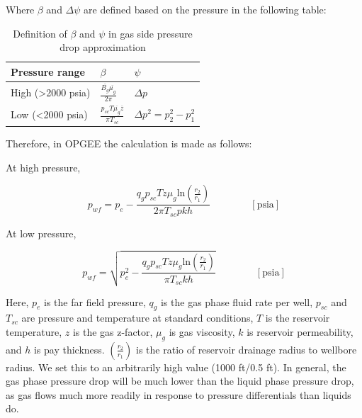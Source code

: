 \documentclass[11pt]{report}
\newcommand{\eqnunit}[1]{\quad\quad \scriptstyle{\left[\text{#1}\right]}}
\begin{document}
Where $\beta$ and $\Delta \psi$ are defined based on the pressure in the following table:

\begin{table}[ht]
\begin{scriptsize}
\caption{Definition of $\beta$ and $\psi$ in gas side pressure drop approximation}
\begin{tabular*}{0.8\columnwidth}{p{}p{}p{}}
\toprule
Pressure range & $\beta$ & $\psi$ \\
\midrule
High (>2000 psia) & $\frac{\overline{B_g}\overline{\mu_g}}{2\pi}$ & $\Delta p$ \\
Low (<2000 psia) & $\frac{p_{sc} T \overline{\mu_g} \overline{z}}{\pi T_{sc}}$ & $\Delta p^2 = p_2^2 - p_1^2$ \\
\bottomrule
\end{tabular*}
\end{scriptsize}
\end{table}

Therefore, in OPGEE the calculation is made as follows:

At high pressure,

\begin{equation} 
p_{wf} = p_e - \frac{q_g p_{sc} T z \mu_g \text{ln}\left(\frac{r_2}{r_1} \right)}{2 \pi T_{sc} p k h} \quad\quad\eqnunit{psia}
\end{equation}

At low pressure,

\begin{equation} 
p_{wf} = \sqrt{p_e^2 - \frac{q_g p_{sc} T z \mu_g \text{ln}\left(\frac{r_2}{r_1} \right)}{\pi T_{sc} k h}} \quad\quad\eqnunit{psia}
\end{equation}

Here, $p_e$ is the far field pressure, $q_g$ is the gas phase fluid rate per well, $p_{sc}$ and $T_{sc}$ are pressure and temperature at standard conditions, $T$ is the reservoir temperature, $z$ is the gas z-factor, $\mu_g$ is gas viscosity, $k$ is reservoir permeability, and $h$ is pay thickness. $\left(\frac{r_2}{r_1} \right)$ is the ratio of reservoir drainage radius to wellbore radius. We set this to an arbitrarily high value (1000 ft/0.5 ft). In general, the gas phase pressure drop will be much lower than the liquid phase pressure drop, as gas flows much more readily in response to pressure differentials than liquids do.
\end{document}
